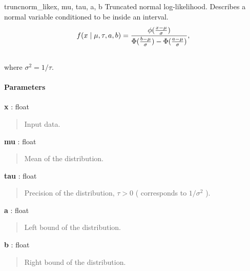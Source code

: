 \hypertarget{pymc.distributions.truncnorm_like}{}
\begin{funcdesc}{truncnorm\_like}{x, mu, tau, a, b}
Truncated normal log-likelihood. Describes a normal variable conditioned to be inside an interval.
\begin{gather}
\begin{split}f(x \mid \mu, \tau, a, b) = \frac{\phi(\frac{x-\mu}{\sigma})} {\Phi(\frac{b-\mu}{\sigma}) - \Phi(\frac{a-\mu}{\sigma})},\end{split}\notag\\\begin{split}\end{split}\notag
\end{gather}
where $\sigma^2=1/\tau$.
\paragraph{Parameters}\begin{paramlist}

\item[] \textbf{x} : float
\begin{quote}

Input data.
\end{quote}

\item[] \textbf{mu} : float
\begin{quote}

Mean of the distribution.
\end{quote}

\item[] \textbf{tau} : float
\begin{quote}

Precision of the distribution, $\tau>0$ ( corresponds to $1/\sigma^2$ ).
\end{quote}

\item[] \textbf{a} : float
\begin{quote}

Left bound of the distribution.
\end{quote}

\item[] \textbf{b} : float
\begin{quote}

Right bound of the distribution.
\end{quote}
\end{paramlist}
\end{funcdesc}


